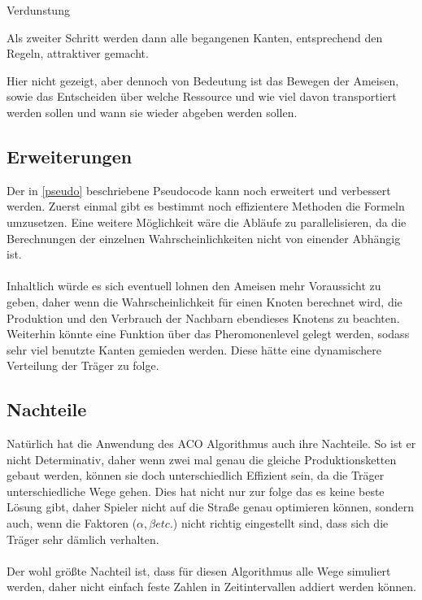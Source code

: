 \documentclass[12pt]{article}
\begin{document}
\begin{algorithm}[H]
\caption{Verdunstung}
\end{algorithm}Als zweiter Schritt werden dann alle begangenen Kanten, entsprechend den Regeln, attraktiver gemacht.
\begin{algorithm}
\DontPrintSemicolon
{}
Hier nicht gezeigt, aber dennoch von Bedeutung ist das Bewegen der Ameisen, sowie das Entscheiden über welche Ressource und wie viel davon transportiert werden sollen und wann sie wieder abgeben werden sollen.
\end{algorithm}
\subsection{Erweiterungen}
Der in \ref{pseudo} beschriebene Pseudocode kann noch erweitert und verbessert werden. Zuerst einmal gibt es bestimmt noch effizientere Methoden die Formeln umzusetzen.
Eine weitere Möglichkeit wäre die Abläufe zu parallelisieren, da die Berechnungen der einzelnen Wahrscheinlichkeiten nicht von einender Abhängig ist.\\\\
Inhaltlich würde es sich eventuell lohnen den Ameisen mehr Voraussicht zu geben, daher wenn die Wahrscheinlichkeit für einen Knoten berechnet wird, die Produktion und den Verbrauch der Nachbarn ebendieses Knotens zu beachten. 
Weiterhin könnte eine Funktion über das Pheromonenlevel gelegt werden, sodass sehr viel benutzte Kanten gemieden werden. Diese hätte eine dynamischere Verteilung der Träger zu folge.
\subsection{Nachteile}\label{Nachteile}
Natürlich hat die Anwendung des ACO Algorithmus auch ihre Nachteile. So ist er nicht Determinativ, daher wenn zwei mal genau die gleiche Produktionsketten gebaut werden, können sie doch unterschiedlich Effizient sein, da die Träger unterschiedliche Wege gehen.
Dies hat nicht nur zur folge das es keine beste Lösung gibt, daher Spieler nicht auf die Straße genau optimieren können, sondern auch, wenn die Faktoren ($\alpha,\beta etc.$) nicht richtig eingestellt sind, dass sich die Träger sehr dämlich verhalten.\\\\
Der wohl größte Nachteil ist, dass für diesen Algorithmus alle Wege simuliert werden, daher nicht einfach feste Zahlen in Zeitintervallen addiert werden können.
\end{document}
